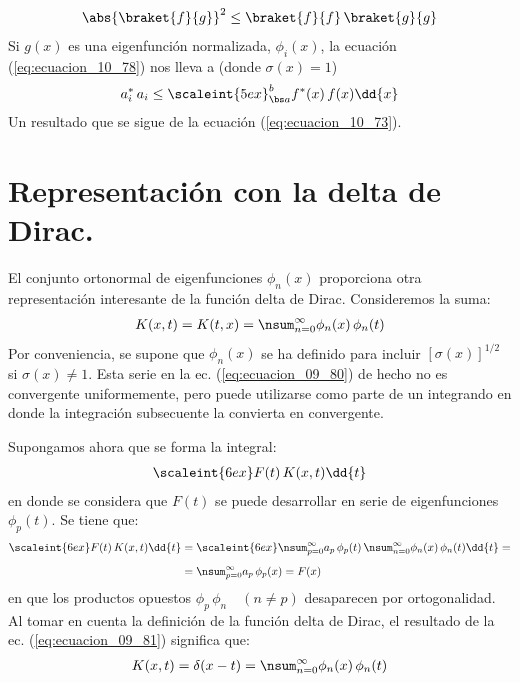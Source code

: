 \begin{align}
\abs{\braket{f}{g}}^{2} \leq \braket{f}{f} \, \braket{g}{g}
\label{eq:ecuacion_10_78a}
\end{align}
Si $g (x)$ es una eigenfunción normalizada, $\phi_{i} (x)$, la ecuación (\ref{eq:ecuacion_10_78}) nos lleva a (donde $\sigma (x) = 1$)
\begin{align}
a_{i}^{*} \, a_{i} \leq \scaleint{5ex}_{\bs a}^{b} f^{*} (x) \, f (x) \dd{x} 
\label{eq:ecuacion_10_81}
\end{align}
Un resultado que se sigue de la ecuación (\ref{eq:ecuacion_10_73}).

\section{Representación con la delta de Dirac.}

 El conjunto ortonormal de eigenfunciones $\phi_{n} (x)$ proporciona otra representación interesante de la función delta de Dirac. Consideremos la suma:
\begin{align}
K (x, t) = K (t, x) = \nsum_{n=0}^{\infty} \phi_{n} (x) \, \phi_{n} (t)
\label{eq:ecuacion_09_80}
\end{align}
Por conveniencia, se supone que $\phi_{n} (x)$ se ha definido para incluir $[\sigma (x)]^{1/2}$ si $\sigma (x) \neq 1$. Esta serie en la ec. (\ref{eq:ecuacion_09_80}) de hecho no es convergente uniformemente, pero puede utilizarse como parte de un integrando en donde la integración subsecuente la convierta en convergente.
\par
Supongamos ahora que se forma la integral:
\begin{align*}
\scaleint{6ex} F (t) \, K (x, t) \dd{t}
\end{align*}
en donde se considera que $F (t)$ se puede desarrollar en serie de eigenfunciones $\phi_{p} (t)$. Se tiene que:
\begin{align}
\begin{aligned}[b]
\scaleint{6ex} F (t) \, K (x, t) \dd{t} &= \scaleint{6ex} \nsum_{p=0}^{\infty} a_{p} \, \phi_{p} (t) \, \nsum_{n=0}^{\infty} \phi_{n} (x) \, \phi_{n} (t) \dd{t} = \\[0.5em]
&= \nsum_{p=0}^{\infty} a_{p} \, \phi_{p} (x) = F (x)
\end{aligned}
\label{eq:ecuacion_09_81}
\end{align}
en que los productos opuestos $\phi_{p} \, \phi_{n} \quad (n \neq p)$ desaparecen por ortogonalidad. Al tomar en cuenta la definición de la función delta de Dirac, el resultado de la ec. (\ref{eq:ecuacion_09_81}) significa que:
\begin{align}
K (x, t) = \delta (x - t) = \nsum_{n=0}^{\infty} \phi_{n} (x) \, \phi_{n} (t)
\label{eq:ecuacion_09_82}
\end{align}

